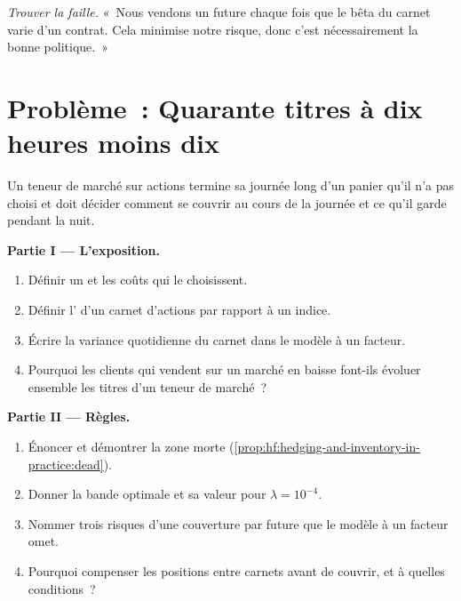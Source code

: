 \begin{exercise}[$\star\star\star$]\label{exo:hf:hedging-and-inventory-in-practice:8}
\emph{Trouver la faille.} «~Nous vendons un future chaque fois que le bêta du carnet varie d'un contrat. Cela minimise notre risque, donc c'est nécessairement la bonne politique.~»
\end{exercise}

\section{Problème~: Quarante titres à dix heures moins dix}

\begin{problem}\label{pb:hf:hedging-and-inventory-in-practice:1}
Un teneur de marché sur actions termine sa journée long d'un panier qu'il n'a pas choisi et doit décider comment se couvrir au cours de la journée et ce qu'il garde pendant la nuit.

\medskip\noindent\textbf{Partie I --- L'exposition.}
\begin{enumerate}
\item Définir un  et les coûts qui le choisissent.
\item Définir l' d'un carnet d'actions par rapport à un indice.
\item Écrire la variance quotidienne du carnet dans le modèle à un facteur.
\item Pourquoi les clients qui vendent sur un marché en baisse font-ils évoluer ensemble les titres d'un teneur de marché~?
\end{enumerate}

\medskip\noindent\textbf{Partie II --- Règles.}
\begin{enumerate}[resume]
\item Énoncer et démontrer la zone morte (\cref{prop:hf:hedging-and-inventory-in-practice:dead}).
\item Donner la bande optimale et sa valeur pour $\lambda=10^{-4}$.
\item Nommer trois risques d'une couverture par future que le modèle à un facteur omet.
\item Pourquoi compenser les positions entre carnets avant de couvrir, et à quelles conditions~?
\end{enumerate}


\end{problem}
